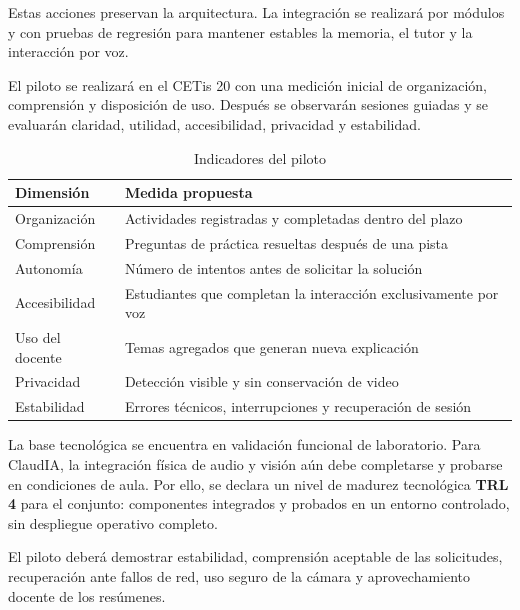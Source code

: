 \documentclass[11pt]{article}
\newcommand{\Section}[1]{\par\vspace{0.16\baselineskip}{\normalfont\normalsize\bfseries\RaggedRight #1\par}}
\newcommand{\Subsection}[1]{\par\vspace{0.12\baselineskip}{\normalfont\normalsize\bfseries\RaggedRight #1\par\vspace{0.07\baselineskip}}}
\begin{document}
Estas acciones preservan la arquitectura. La integración se realizará por módulos y con pruebas de regresión para mantener estables la memoria, el tutor y la interacción por voz.

\clearpage

\Section{Plan de evaluación y nivel de madurez}

El piloto se realizará en el CETis 20 con una medición inicial de organización, comprensión y disposición de uso. Después se observarán sesiones guiadas y se evaluarán claridad, utilidad, accesibilidad, privacidad y estabilidad.

\begin{table}[H]
\centering
\caption{Indicadores del piloto}
\begin{tabularx}{\textwidth}{@{}>{\raggedright\arraybackslash}p{1.75in}>{\raggedright\arraybackslash}X@{}}
\toprule
\textbf{Dimensión} & \textbf{Medida propuesta} \\
\midrule
Organización & Actividades registradas y completadas dentro del plazo \\
Comprensión & Preguntas de práctica resueltas después de una pista \\
Autonomía & Número de intentos antes de solicitar la solución \\
Accesibilidad & Estudiantes que completan la interacción exclusivamente por voz \\
Uso del docente & Temas agregados que generan nueva explicación \\
Privacidad & Detección visible y sin conservación de video \\
Estabilidad & Errores técnicos, interrupciones y recuperación de sesión \\
\bottomrule
\end{tabularx}
\end{table}

\Subsection{Nivel de madurez}
La base tecnológica se encuentra en validación funcional de laboratorio. Para ClaudIA, la integración física de audio y visión aún debe completarse y probarse en condiciones de aula. Por ello, se declara un nivel de madurez tecnológica \textbf{TRL 4} para el conjunto: componentes integrados y probados en un entorno controlado, sin despliegue operativo completo.

\Subsection{Criterios de salida}
El piloto deberá demostrar estabilidad, comprensión aceptable de las solicitudes, recuperación ante fallos de red, uso seguro de la cámara y aprovechamiento docente de los resúmenes.
\end{document}
